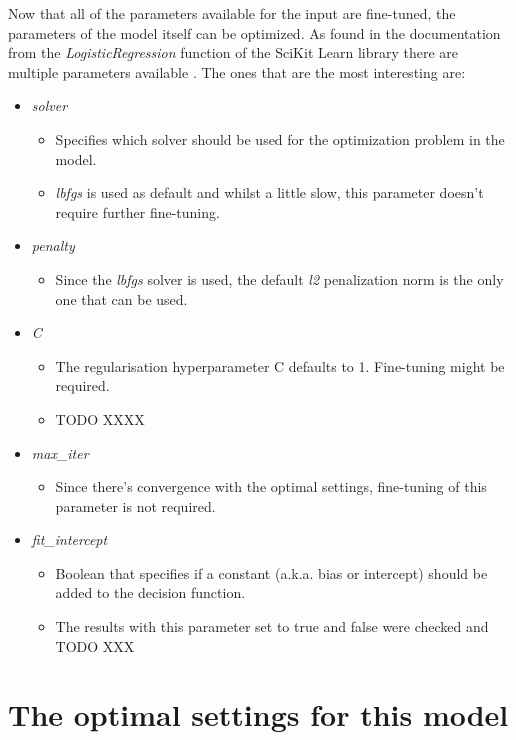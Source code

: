 Now that all of the parameters available for the input are fine-tuned, the parameters of the model itself can be optimized.
As found in the documentation from the \emph{LogisticRegression} function of the SciKit Learn library there are multiple parameters available \citep{scikit_learn}.
The ones that are the most interesting are:
\begin{itemize}
    \item \emph{solver}
    \begin{itemize}
        \item Specifies which solver should be used for the optimization problem in the model.
        \item \emph{lbfgs} is used as default and whilst a little slow, this parameter doesn't require further fine-tuning.
    \end{itemize}
    \item \emph{penalty}
    \begin{itemize}
        \item Since the \emph{lbfgs} solver is used, the default \emph{l2} penalization norm is the only one that can be used.
    \end{itemize}
    \item \emph{C}
    \begin{itemize}
        \item The regularisation hyperparameter C defaults to 1. Fine-tuning might be required.
        \item TODO XXXX
    \end{itemize}
    \item \emph{max\_iter}
    \begin{itemize}
        \item Since there's convergence with the optimal settings, fine-tuning of this parameter is not required.
    \end{itemize}
    \item \emph{fit\_intercept}
    \begin{itemize}
        \item Boolean that specifies if a constant (a.k.a. bias or intercept) should be added to the decision function.
        \item The results with this parameter set to true and false were checked and TODO XXX
    \end{itemize}
\end{itemize}



\section{The optimal settings for this model}
\label{section:LBM_optimal}

